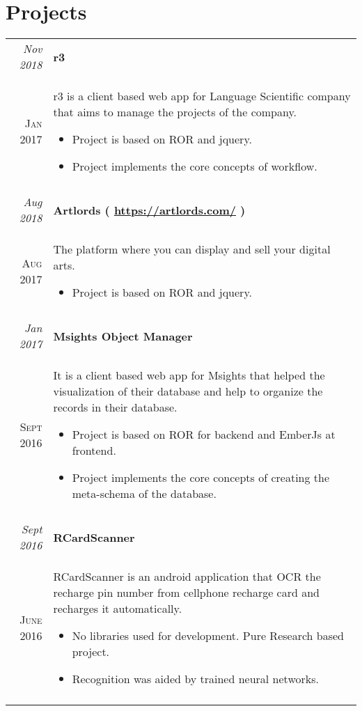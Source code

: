 \documentclass[a4paper,10pt]{article}
\begin{document}
\section{Projects}
\begin{tabular}{r|p{11cm}}

\emph{Nov 2018} & \textbf{r3}\\ \textsc{Jan 2017} & \small{r3 is a client based web app for Language Scientific company that aims to manage the projects of the company. 

\footnotesize{
\begin{itemize}
\item Project is based on ROR and jquery.
\item Project implements the core concepts of workflow.
\end{itemize}
}}\\\multicolumn{2}{c}{} \\


\emph{Aug 2018} & \textbf{Artlords ( \href{https://artlords.com/}{https://artlords.com/} )}\\ \textsc{Aug 2017} & \small{The platform where you can display and sell your digital arts. 

\footnotesize{
\begin{itemize}
\item Project is based on ROR and jquery.
\end{itemize}
}}\\\multicolumn{2}{c}{} \\

\emph{Jan 2017} & \textbf{Msights Object Manager}\\ \textsc{Sept 2016} & \small{It is a client based web app for Msights that helped the visualization of their database and help to organize the records in their database. 
\footnotesize{
\begin{itemize}
\item Project is based on ROR for backend and EmberJs at frontend.
\item Project implements the core concepts of creating the meta-schema of the database.
\end{itemize}
}}\\\multicolumn{2}{c}{} \\

\emph{Sept 2016} & \textbf{RCardScanner}\\ \textsc{June 2016} & \small{RCardScanner is an android application that OCR the recharge pin number
from cellphone recharge card and recharges it automatically.
\footnotesize{
\begin{itemize}
\item No libraries used for development. Pure Research based project.
\item Recognition was aided by trained neural networks.
\end{itemize}
}}\\\multicolumn{2}{c}{} \\


\end{tabular}
\end{document}
